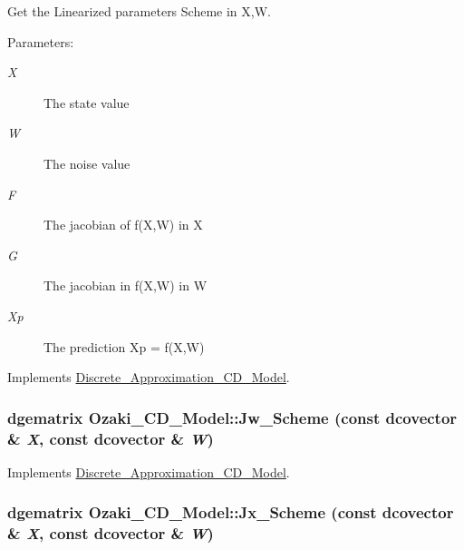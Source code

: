 Get the Linearized parameters Scheme in X,W. 

\begin{Desc}
\item[Parameters:]
\begin{description}
\item[{\em X}]The state value \item[{\em W}]The noise value \item[{\em F}]The jacobian of f(X,W) in X \item[{\em G}]The jacobian in f(X,W) in W \item[{\em Xp}]The prediction Xp = f(X,W) \end{description}
\end{Desc}


Implements \hyperlink{class_discrete___approximation___c_d___model_0a486fada10e6f5569d186edc7b32110}{Discrete\_\-Approximation\_\-CD\_\-Model}.\hypertarget{class_ozaki___c_d___model_66009069506580d175c869cea3df3cd6}{
\subsubsection[{Jw\_\-Scheme}]{\setlength{\rightskip}{0pt plus 5cm}dgematrix Ozaki\_\-CD\_\-Model::Jw\_\-Scheme (const dcovector \& {\em X}, \/  const dcovector \& {\em W})}}
\label{class_ozaki___c_d___model_66009069506580d175c869cea3df3cd6}




Implements \hyperlink{class_discrete___approximation___c_d___model_c7496999409a3f05125ceb7fe85e85ab}{Discrete\_\-Approximation\_\-CD\_\-Model}.\hypertarget{class_ozaki___c_d___model_6c4415b26674d1fc7b5e4f7499f35dd9}{
\subsubsection[{Jx\_\-Scheme}]{\setlength{\rightskip}{0pt plus 5cm}dgematrix Ozaki\_\-CD\_\-Model::Jx\_\-Scheme (const dcovector \& {\em X}, \/  const dcovector \& {\em W})}}
\label{class_ozaki___c_d___model_6c4415b26674d1fc7b5e4f7499f35dd9}




